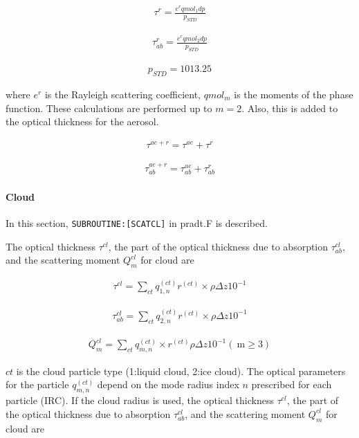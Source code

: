\begin{eqnarray}
\tau^{r}=\frac{e^{r}qmol_{1}dp}{p_{S T D}}
\end{eqnarray}

\begin{eqnarray}
\tau_{ab}^{r}=\frac{e^{r}qmol_{2}dp}{p_{S T D}}
\end{eqnarray}

\begin{eqnarray}
p_{S T D}=1013.25
\end{eqnarray}

where \(e^{r}\) is the Rayleigh scattering coefficient, \(qmol_m\) is the moments of the phase function. These calculations are performed up to \(m=2\). Also, this is added to the optical thickness
for the aerosol.

\begin{eqnarray}
\tau^{a e+r}=\tau^{a e}+\tau^{r}
\end{eqnarray}

\begin{eqnarray}
\tau_{ab}^{a e+r}=\tau_{ab}^{a e}+\tau_{ab}^{r}
\end{eqnarray}

\hypertarget{cloud}{%
\paragraph{Cloud}\label{cloud}}

In this section, \texttt{SUBROUTINE:{[}SCATCL{]}} in pradt.F is described.

The optical thickness \(\tau^{cl}\), the part of the optical thickness due to absorption \(\tau_{ab}^{cl}\), and the scattering moment \(Q_{m}^{c l}\) for cloud are

\begin{eqnarray}
\tau^{c l}=\sum_{c t} q_{1, n}^{(c t)}r^{(c t)}\times \rho \Delta z 10^{-1}
\end{eqnarray}

\begin{eqnarray}
\tau_{ab}^{c l}=\sum_{c t} q_{2, n}^{(c t)}r^{(c t)}\times \rho \Delta z 10^{-1}
\end{eqnarray}

\begin{eqnarray}
Q_{m}^{c l}=\sum_{c t} q_{m, n}^{(c t)} \times r^{(c t)} \rho \Delta z 10^{-1}(\mathrm{~m} \geq 3)
\end{eqnarray}

\(ct\) is the cloud particle type (1:liquid cloud, 2:ice cloud). The optical parameters for the particle \(q_{m, n}^{(c t)}\) depend on the mode radius index \(n\) prescribed for each particle (IRC).
If the cloud radius is used, the optical thickness \(\tau^{cl}\), the part of the optical thickness due to absorption \(\tau_{ab}^{cl}\), and the scattering moment \(Q_{m}^{c l}\) for cloud are

